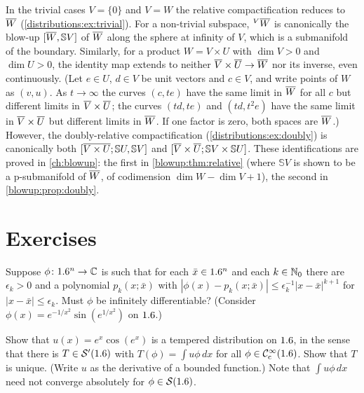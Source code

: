 \begin{remark}\label{distributions:rem:blowup}
In the trivial cases $V=\{0\}$ and $V=W$ the relative compactification reduces to
$\overline{W}$ (\cref{distributions:ex:trivial}). For a non-trivial subspace, ${}^{V}\overline{W}$
is canonically the blow-up $[\overline{W},\mathbb{S}V]$ of $\overline{W}$ along the sphere at
infinity of $V$, which is a submanifold of the boundary. Similarly, for a product
$W=V\times U$ with $\dim V>0$ and $\dim U>0$, the identity map extends to neither
$\overline{V}\times\overline{U}\to\overline{W}$ nor its inverse, even continuously. (Let $e\in U$, $d\in V$ be unit vectors and $c\in V$, and
write points of $W$ as $(v,u)$. As $t\to\infty$ the curves $(c,te)$ have the same limit
in $\overline{W}$ for all $c$ but different limits in $\overline{V}\times\overline{U}$; the curves
$(td,te)$ and $(td,t^2e)$ have the same limit in $\overline{V}\times\overline{U}$ but different
limits in $\overline{W}$. If one factor is zero, both
spaces are $\overline{W}$.) However, the doubly-relative compactification
(\cref{distributions:ex:doubly}) is canonically both $[\overline{V\times U};\mathbb{S}U,\mathbb{S}V]$
and $[\overline{V}\times\overline{U};\mathbb{S}V\times\mathbb{S}U]$. These identifications are
proved in \cref{ch:blowup}: the first in \cref{blowup:thm:relative} (where $\mathbb{S}V$
is shown to be a p-submanifold of $\overline{W}$, of codimension $\dim W-\dim V+1$), the second
in \cref{blowup:prop:doubly}.
\end{remark}

\section{Exercises}\label{distributions:sec:exercises}

\begin{exercise}\label{distributions:ex:taylor}
Suppose $\phi\colon1.6^n\to\mathbb{C}$ is such that for each $\bar x\in1.6^n$ and each $k\in\mathbb{N}_0$
there are $\epsilon_k>0$ and a polynomial $p_k(x;\bar x)$ with
$|\phi(x)-p_k(x;\bar x)|\le\epsilon_k^{-1}|x-\bar x|^{k+1}$ for $|x-\bar x|\le\epsilon_k$.
Must $\phi$ be infinitely differentiable? (Consider
$\phi(x)=e^{-1/x^2}\sin(e^{1/x^2})$ on $1.6$.)
\end{exercise}

\begin{exercise}\label{distributions:ex:exp-cos}
Show that $u(x)=e^x\cos(e^x)$ is a tempered distribution on $1.6$, in the sense that
there is $T\in\mathcal{S}'(1.6)$ with $T(\phi)=\int u\phi\,dx$ for all $\phi\in\mathcal{C}^\infty_{\mathrm{c}}(1.6)$. Show
that $T$ is unique. (Write $u$ as the derivative of a bounded function.) Note that
$\int u\phi\,dx$ need not converge absolutely for $\phi\in\mathcal{S}(1.6)$.
\end{exercise}

